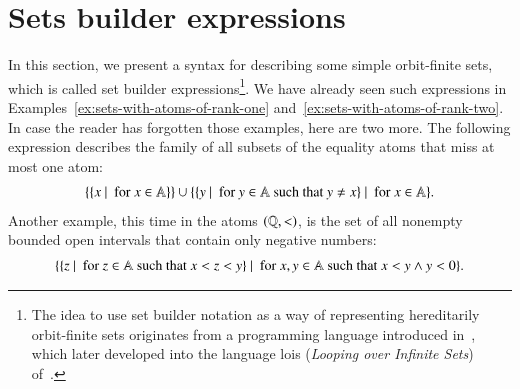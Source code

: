 \section{Sets builder expressions}
\label{sec:set-builder-expressions}
In this section, we  present a syntax for describing  some simple orbit-finite sets, which is called  set builder expressions\footnote{The idea to use set builder notation as a way of representing hereditarily orbit-finite sets originates from a programming language introduced in~\cite{DBLP:conf/fsttcs/BojanczykT12}, which later developed into the language {\sc lois} (\emph{Looping over Infinite Sets}) of~\cite{DBLP:conf/cade/KopczynskiT16,DBLP:conf/popl/KopczynskiT17}.  
}. 
We have already seen such expressions in Examples~\ref{ex:sets-with-atoms-of-rank-one} and~\ref{ex:sets-with-atoms-of-rank-two}. In case the reader has forgotten those examples, here are two more. The following expression describes  the family of all subsets of the equality atoms that miss at most one atom:
\begin{align*}
\{\{x\ |\ \text{ for }x \in \mathbb A\}\} \cup \{ \{y\ |\ \text{ for }y \in \mathbb A \text{ such that }y\neq x\}\ |\ \text{ for }x \in \mathbb A\}.
\end{align*}
Another example, this time in the atoms $(\mathbb Q, <)$, is the set of all nonempty bounded open intervals that contain only negative numbers:
\begin{align*}
	 \{\{z\ |\ \text{ for }z \in \mathbb A \text{ such that }x < z < y\}\ |\ \text{ for }x,y \in \mathbb A \text{ such that }x < y \land y < 0 \}.
\end{align*} 




